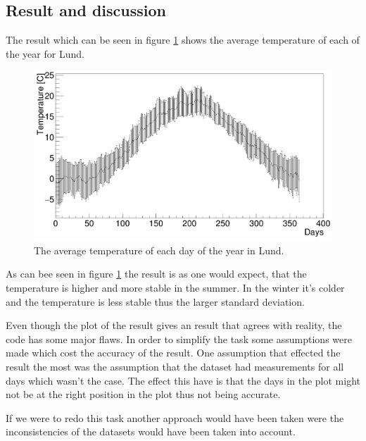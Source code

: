 \documentclass[../main.tex]{subfiles}
\begin{document}
\subsection{Result and discussion}
The result which can be seen in figure \ref{avgtemp} shows the average temperature of each of the year for Lund.

\begin{figure}[H]
\includegraphics[scale = 0.2]{avg_temp.png}
\caption{The average temperature of each day of the year in Lund.}
\label{avgtemp}
\end{figure}


As can bee seen in figure \ref{avgtemp} the result is as one would expect, that the temperature is higher and more stable in the summer. In the winter it's colder and the temperature is less stable thus the larger standard deviation.

Even though the plot of the result gives an result that agrees with reality, the code has some major flaws. In order to simplify the task some assumptions were made which cost the accuracy of the result. One assumption that effected the result the most was the assumption that the dataset had measurements for all days which wasn't the case. The effect this have is that the days in the plot might not be at the right position in the plot thus not being accurate.

If we were to redo this task another approach would have been taken were the inconsistencies of the datasets would have been taken into account.
\end{document}
